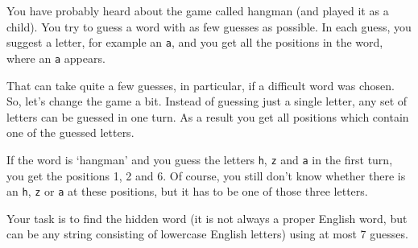 
You have probably heard about the game called hangman (and played it
as a child). You try to guess a word with as few guesses as
possible. In each guess, you suggest a letter, for example an \texttt{a}, and
you get all the positions in the word, where an \texttt{a} appears.

That can take quite a few guesses, in particular, if a difficult word
was chosen. So, let's change the game a bit. Instead of
guessing just a single letter, any set of letters can be guessed in
one turn. As a result you get all positions which contain one of the guessed letters.

If the word is `hangman' and you guess the letters \texttt{h}, \texttt{z} and \texttt{a} in the first
turn, you get the positions 1, 2 and 6. Of course, you still don't know
whether there is an \texttt{h}, \texttt{z} or \texttt{a} at these positions, but it has to
be one of those three letters.

Your task is to find the hidden word (it is not always a proper English
word, but can be any string consisting of lowercase English letters) using at
most 7 guesses.

